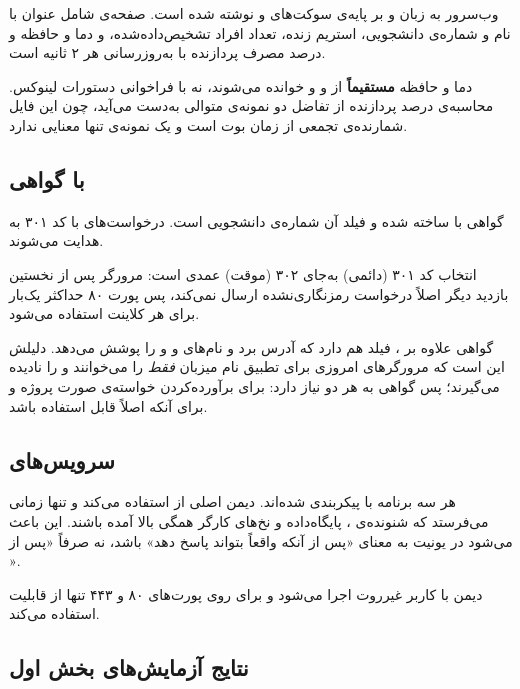 وب‌سرور به زبان  و بر پایه‌ی سوکت‌های  و  نوشته شده است. صفحه‌ی  شامل عنوان با نام و شماره‌ی دانشجویی، استریم زنده، تعداد افراد تشخیص‌داده‌شده، و دما و حافظه و درصد مصرف پردازنده با به‌روزرسانی هر ۲ ثانیه است.

دما و حافظه \textbf{مستقیماً} از  و  و  خوانده می‌شوند، نه با فراخوانی دستورات لینوکس. محاسبه‌ی درصد پردازنده از تفاضل دو نمونه‌ی متوالی  به‌دست می‌آید، چون این فایل شمارنده‌ی تجمعی از زمان بوت است و یک نمونه‌ی تنها معنایی ندارد.

\subsection{ با گواهی }

گواهی با  ساخته شده و فیلد  آن شماره‌ی دانشجویی است. درخواست‌های  با کد ۳۰۱ به  هدایت می‌شوند.

انتخاب کد ۳۰۱ (دائمی) به‌جای ۳۰۲ (موقت) عمدی است: مرورگر پس از نخستین بازدید دیگر اصلاً درخواست رمزنگاری‌نشده ارسال نمی‌کند، پس پورت ۸۰ حداکثر یک‌بار برای هر کلاینت استفاده می‌شود.

گواهی علاوه بر ، فیلد  هم دارد که آدرس  برد و نام‌های  و  و  را پوشش می‌دهد. دلیلش این است که مرورگرهای امروزی برای تطبیق نام میزبان \emph{فقط}  را می‌خوانند و  را نادیده می‌گیرند؛ پس گواهی به هر دو نیاز دارد:  برای برآورده‌کردن خواسته‌ی صورت پروژه و  برای آنکه اصلاً قابل استفاده باشد.

\subsection{سرویس‌های }

هر سه برنامه با  پیکربندی شده‌اند. دیمن اصلی از  استفاده می‌کند و تنها زمانی  می‌فرستد که شنونده‌ی ، پایگاه‌داده و نخ‌های کارگر همگی بالا آمده باشند. این باعث می‌شود  در یونیت  به معنای «پس از آنکه واقعاً بتواند پاسخ دهد» باشد، نه صرفاً «پس از ».

دیمن با کاربر غیرروت  اجرا می‌شود و برای  روی پورت‌های ۸۰ و ۴۴۳ تنها از قابلیت  استفاده می‌کند.

\subsection{نتایج آزمایش‌های بخش اول}

